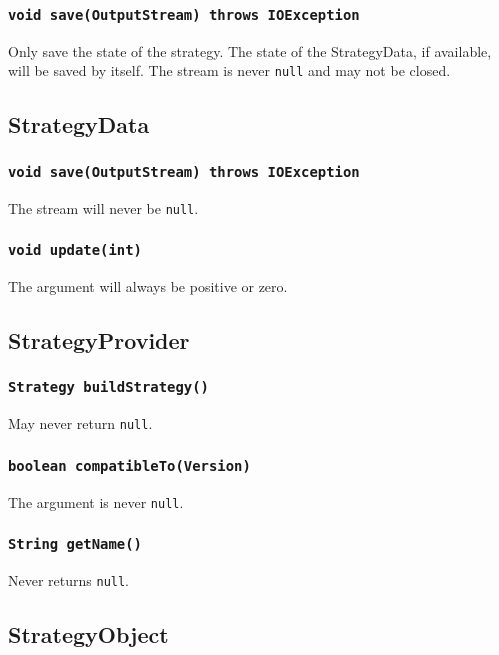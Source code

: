 \documentclass{article}
\begin{document}
\subsubsection{\texttt{void save(OutputStream) throws IOException}}
Only save the state of the strategy. The state of the StrategyData, if available, will be saved by itself.
The stream is never \texttt{null} and may not be closed.

\subsection{StrategyData}

\subsubsection{\texttt{void save(OutputStream) throws IOException}}
The stream will never be \texttt{null}.

\subsubsection{\texttt{void update(int)}}
The argument will always be positive or zero.

\subsection{StrategyProvider}

\subsubsection{\texttt{Strategy buildStrategy()}}
May never return \texttt{null}.

\subsubsection{\texttt{boolean compatibleTo(Version)}}
The argument is never \texttt{null}.

\subsubsection{\texttt{String getName()}}
Never returns \texttt{null}.

\subsection{StrategyObject}
\end{document}
